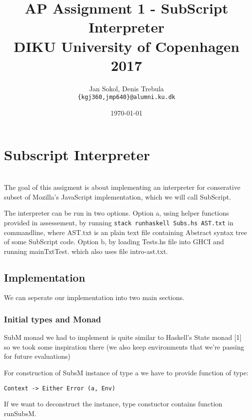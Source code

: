\documentclass[11pt]{article}
\title{
  \vspace{3cm}
  \Huge{AP Assignment 1 - SubScript Interpreter} \\
  \Large{DIKU University of Copenhagen 2017}
}
\author{
  \Large{Jan Sokol, Denis Trebula}
  \\ \texttt{\{kgj360,jmp640\}@alumni.ku.dk} \\
}
\date{
    \today
}
\def \ColourPDF {include/ku-farve}
\def \TitlePDF   {include/ku-en}  %
\begin{document}


\clearpage\maketitle
\thispagestyle{empty}

\newpage







\section{Subscript Interpreter} \\
The goal of this assigment is about implementing an interpreter for conserative subset of Mozilla's JavaScript implementation, which
we will call SubScript.

The interpreter can be run in two options. Option a, using helper functions provided in assessement, by running \texttt{stack runhaskell Subs.hs AST.txt} in commandline, where AST.txt is an plain text file containing Abstract syntax tree of some SubScript code.
Option b, by loading Tests.hs file into GHCI and running mainTxtTest. which also uses file intro-ast.txt.

\subsection{Implementation}
We can seperate our implementation into two main sections.

\subsubsection{Initial types and Monad}
SubM monad we had to implement is quite similar to Haskell's State monad [1] so we took some inspiration there (we also keep environments that we're passing for future evaluations)

For construction of SubsM instance of type a we have to provide function of type:
\begin{verbatim}
Context -> Either Error (a, Env)
\end{verbatim} 
If we want to deconstruct the instance, type constuctor contains function runSubsM. 
\end{document}
